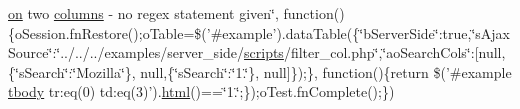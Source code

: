 \begin{DoxyCompactItemize}
\hyperlink{fullpage_2plugin_8min_8js_a1cfa98b7fed2aaf9fee3b68dbb7f9497}{on} two \hyperlink{model_8defaults_8columns_8js_af310571d7a4fac04bd949bdefb852a47}{columns} -\/ no regex statement given\char`\"{}, function()\{o\+Session.\+fn\+Restore();o\+Table=\$('\#example').data\+Table(\{\char`\"{}b\+Server\+Side\char`\"{}\+:true,\char`\"{}s\+Ajax\+Source\char`\"{}\+:\char`\"{}../../../examples/server\+\_\+side/\hyperlink{tinymce_8jquery_8dev_8js_a09066d4d580eeec222f858d588b4cdef}{scripts}/filter\+\_\+col.\+php\char`\"{},\char`\"{}ao\+Search\+Cols\char`\"{}\+:\mbox{[}null,\{\char`\"{}s\+Search\char`\"{}\+:\char`\"{}Mozilla\char`\"{}\}, null,\{\char`\"{}s\+Search\char`\"{}\+:\char`\"{}1.\char`\"{}\}, null\mbox{]}\});\}, function()\{return \$('\#example \hyperlink{core_8constructor_8js_a99b0542c7c50fe8757c55bf9dac5f3be}{tbody} tr\+:eq(0) td\+:eq(3)').\hyperlink{tinymce_8jquery_8dev_8js_ac2090bcf2ff968c0083d5de53a6544f3}{html}()==\char`\"{}1.\char`\"{};\});o\+Test.\+fn\+Complete();\})
\end{DoxyCompactItemize}


